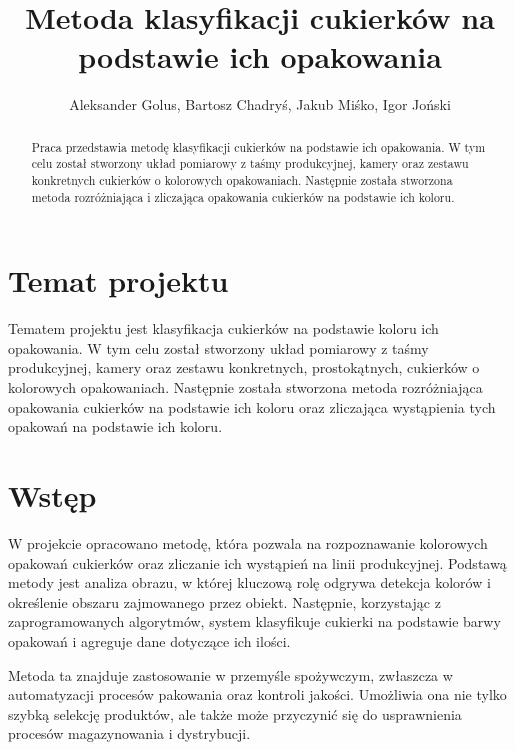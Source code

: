 \documentclass{article}
\title{Metoda klasyfikacji cukierków na podstawie ich opakowania}
\author{Aleksander Golus, Bartosz Chadryś, Jakub Miśko, Igor Joński}
\begin{document}
\maketitle

\begin{abstract}
Praca przedstawia metodę klasyfikacji cukierków na podstawie ich opakowania. W tym celu został stworzony układ pomiarowy z taśmy produkcyjnej, kamery oraz zestawu konkretnych cukierków o kolorowych opakowaniach. Następnie została stworzona metoda rozróżniająca i zliczająca opakowania cukierków na podstawie ich koloru.
\end{abstract}

\section{Temat projektu}
\label{Temat projektu}


Tematem projektu jest klasyfikacja cukierków na podstawie koloru ich opakowania. W tym celu został stworzony układ pomiarowy z taśmy produkcyjnej, kamery oraz zestawu konkretnych, prostokątnych, cukierków o kolorowych opakowaniach. Następnie została stworzona metoda rozróżniająca opakowania cukierków na podstawie ich koloru oraz zliczająca wystąpienia tych opakowań na podstawie ich koloru.

\section{Wstęp}
\label{Wstęp}
W projekcie opracowano metodę, która pozwala na rozpoznawanie kolorowych opakowań cukierków oraz zliczanie ich wystąpień na linii produkcyjnej. Podstawą metody jest analiza obrazu, w której kluczową rolę odgrywa detekcja kolorów i określenie obszaru zajmowanego przez obiekt. Następnie, korzystając z zaprogramowanych algorytmów, system klasyfikuje cukierki na podstawie barwy opakowań i agreguje dane dotyczące ich ilości.

Metoda ta znajduje zastosowanie w przemyśle spożywczym, zwłaszcza w automatyzacji procesów pakowania oraz kontroli jakości. Umożliwia ona nie tylko szybką selekcję produktów, ale także może przyczynić się do usprawnienia procesów magazynowania i dystrybucji.
\end{document}
